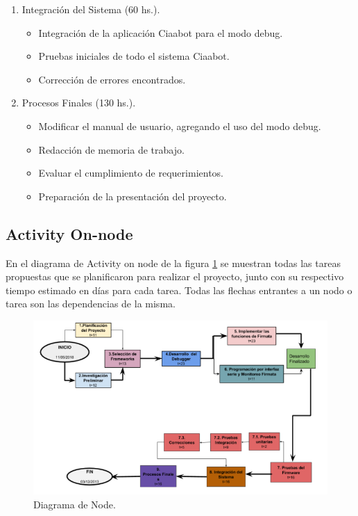 \begin{enumerate}
	\item Integración del Sistema (60 hs.).
	
	\begin{itemize}
		\item Integración de la aplicación Ciaabot para el modo debug.
		\item Pruebas iniciales de todo el sistema Ciaabot.
		\item Corrección de errores encontrados.
	\end{itemize}

	\item Procesos Finales (130 hs.).
	
	\begin{itemize}
		\item Modificar el manual de usuario, agregando el uso del modo debug.
		\item Redacción de memoria de trabajo.
		\item Evaluar el cumplimiento de requerimientos.
		\item Preparación de la presentación del proyecto.
	\end{itemize}

\end{enumerate}

\subsection{Activity On-node} 

En el diagrama de Activity on node de la figura  \ref{fig:diagramaNode} se muestran todas las tareas propuestas que se planificaron para realizar el proyecto, junto con su respectivo tiempo estimado en días para cada tarea.
Todas las flechas entrantes a un nodo o tarea son las dependencias de la misma.
 

\begin{figure}[h]
	\centering
	\includegraphics[scale=.60]{./Figures/diagramaNode.png}
	\caption{Diagrama de Node.}
	\label{fig:diagramaNode}
\end{figure}

